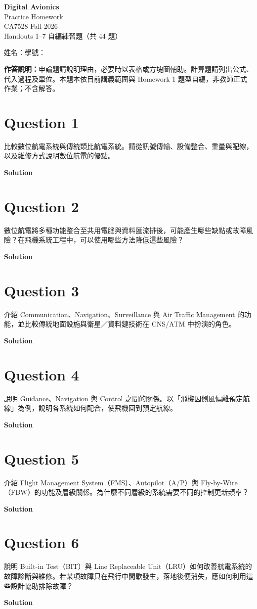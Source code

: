 \documentclass[12pt,a4paper]{article}
\newcommand{\question}[1]{\section*{Question #1}}
\newcommand{\solution}{\par\medskip\textbf{Solution}\par}
\begin{document}
\begin{center}
  {\LARGE\bfseries Digital Avionics}\\[0.3em]
  {\Large Practice Homework}\\[0.5em]
  CA7528 \quad Fall 2026\\[0.3em]
  Handouts 1--7 \quad 自編練習題（共 44 題）
\end{center}
\medskip
姓名：\underline{\hspace{3.4cm}}\hfill 學號：\underline{\hspace{3.4cm}}

\textbf{作答說明：}申論題請說明理由，必要時以表格或方塊圖輔助。計算題請列出公式、代入過程及單位。本題本依目前講義範圍與 Homework 1 題型自編，非教師正式作業；不含解答。

\question{1}
比較數位航電系統與傳統類比航電系統。請從訊號傳輸、設備整合、重量與配線，以及維修方式說明數位航電的優點。
\solution
\vfill
\question{2}
數位航電將多種功能整合至共用電腦與資料匯流排後，可能產生哪些缺點或故障風險？在飛機系統工程中，可以使用哪些方法降低這些風險？
\solution
\vfill
\newpage

\question{3}
介紹 Communication、Navigation、Surveillance 與 Air Traffic Management 的功能，並比較傳統地面設施與衛星／資料鏈技術在 CNS/ATM 中扮演的角色。
\solution
\vfill
\question{4}
說明 Guidance、Navigation 與 Control 之間的關係。以「飛機因側風偏離預定航線」為例，說明各系統如何配合，使飛機回到預定航線。
\solution
\vfill
\newpage

\question{5}
介紹 Flight Management System（FMS）、Autopilot（A/P）與 Fly-by-Wire（FBW）的功能及層級關係。為什麼不同層級的系統需要不同的控制更新頻率？
\solution
\vfill
\question{6}
說明 Built-in Test（BIT）與 Line Replaceable Unit（LRU）如何改善航電系統的故障診斷與維修。若某項故障只在飛行中間歇發生，落地後便消失，應如何利用這些設計協助排除故障？
\solution
\vfill
\newpage
\end{document}
